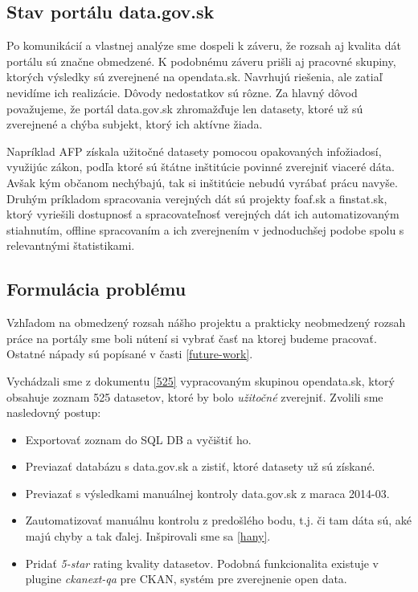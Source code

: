 \documentclass[12pt,a4paper]{article}
\begin{document}
\subsection{Stav portálu data.gov.sk} 
Po komunikácií a vlastnej analýze sme dospeli k záveru, že rozsah aj kvalita dát portálu sú značne obmedzené. K podobnému záveru prišli aj pracovné skupiny, ktorých výsledky sú zverejnené na opendata.sk. Navrhujú riešenia, ale zatiaľ nevidíme ich realizácie. Dôvody nedostatkov sú rôzne. Za hlavný dôvod považujeme, že portál data.gov.sk zhromažďuje len datasety, ktoré už sú zverejnené a chýba subjekt, ktorý ich aktívne žiada. 

Napríklad AFP získala užitočné datasety pomocou opakovaných infožiadosí, využijúc zákon, podľa ktoré sú štátne inštitúcie povinné zverejniť viaceré dáta. Avšak kým občanom nechýbajú, tak si inštitúcie nebudú vyrábať prácu navyše. Druhým príkladom spracovania verejných dát sú projekty foaf.sk a finstat.sk, ktorý vyriešili dostupnosť a spracovateľnosť verejných dát ich automatizovaným stiahnutím, offline spracovaním a ich zverejnením v jednoduchšej podobe spolu s relevantnými štatistikami. 

\subsection{Formulácia problému} 
\label{problem-statement}

Vzhľadom na obmedzený rozsah nášho projektu a prakticky neobmedzený rozsah práce na portály sme boli nútení si vybrať časť na ktorej budeme pracovať. Ostatné nápady sú popísané v časti \ref{future-work}. 

Vychádzali sme z dokumentu \ref{525} vypracovaným skupinou opendata.sk, ktorý obsahuje zoznam 525 datasetov, ktoré by bolo \emph{užitočné} zverejniť. Zvolili sme nasledovný postup:  
\begin{itemize} 
\item Exportovať zoznam do SQL DB a vyčištiť ho. 
\item Previazať databázu s data.gov.sk a zistiť, ktoré datasety už sú získané. 
\item Previazať s výsledkami manuálnej kontroly data.gov.sk z maraca 2014-03. 
\item Zautomatizovať manuálnu kontrolu z predošlého bodu, t.j. či tam dáta sú, aké majú chyby a tak ďalej. Inšpirovali sme sa \ref{hany}. 
\item Pridať \emph{5-star} rating kvality datasetov. Podobná funkcionalita existuje v plugine \emph{ckanext-qa} pre CKAN, systém pre zverejnenie open data.  
\end{itemize} 
\end{document}
